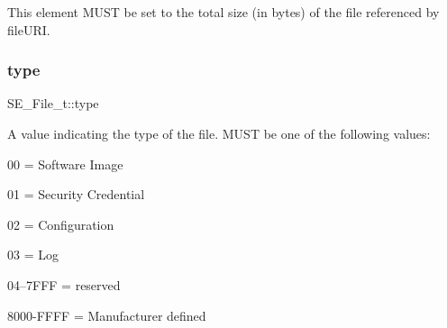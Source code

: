 This element M\+U\+ST be set to the total size (in bytes) of the file referenced by file\+U\+RI. \mbox{\label{group__File_gac0aab114d7b9752adb600099323cd594}} 
\subsubsection{\texorpdfstring{type}{type}}
{\footnotesize\ttfamily S\+E\+\_\+\+File\+\_\+t\+::type}

A value indicating the type of the file. M\+U\+ST be one of the following values\+:

00 = Software Image

01 = Security Credential

02 = Configuration

03 = Log

04–7\+F\+FF = reserved

8000-\/\+F\+F\+FF = Manufacturer defined 